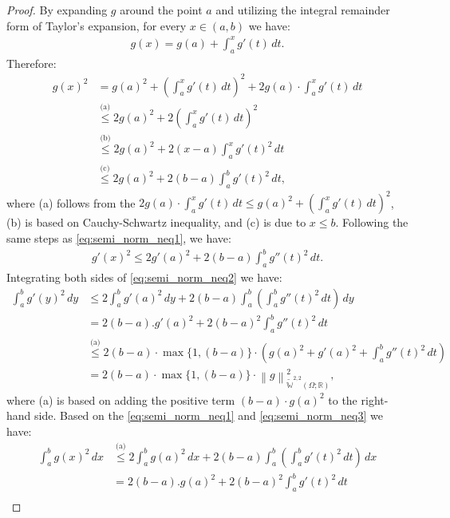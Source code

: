 \documentclass{article}
\newcommand{\norm}[1]{\left\lVert#1\right\rVert}
\newcommand{\sobeq}[2]{\widetilde{\mathbb{W}}^{#1,#2}\left(\Omega; \mathbb{R}\right)}
\newcommand{\lec}[2]{\stackrel{\text{#1}}{#2}}
\begin{document}
\begin{proof}
    By expanding $g$ around the point $a$ and utilizing the integral remainder form of Taylor's expansion, for every $x \in (a,b)$ we have:
    \begin{align}
        g(x) = g(a) + \int_a^x g'(t)\,dt.
    \end{align}
    Therefore: \begin{align}\label{eq:semi_norm_neq1}
        g(x)^2 &= g(a)^2 + \left(\int_a^x g'(t)\,dt \right)^2 + 2g(a)\cdot\int_a^x g'(t)\,dt \nonumber \\ 
        &\lec{(a)}{\leqslant} 2g(a)^2 + 2\left(\int_a^x g'(t)\,dt \right)^2 \nonumber \\ 
        &\lec{(b)}{\leqslant} 2g(a)^2 + 2(x-a)\int_a^x g'(t)^2\,dt \nonumber \\  
        &\lec{(c)}{\leqslant}  2g(a)^2 + 2(b-a)\int_a^b g'(t)^2\,dt,
    \end{align}
    where (a) follows from the $ 2g(a)\cdot\int_a^x g'(t)\,dt \leqslant g(a)^2 + \left(\int_a^x g'(t)\,dt \right)^2$, (b) is based on Cauchy-Schwartz inequality, and (c) is due to $x \leqslant b$. Following the same steps as \eqref{eq:semi_norm_neq1}, we have:
\begin{align}\label{eq:semi_norm_neq2}
        g'(x)^2 \leqslant 2g'(a)^2 + 2(b-a)\int_a^b g''(t)^2\,dt.
    \end{align}
    Integrating both sides of \eqref{eq:semi_norm_neq2} we have:
\begin{align}\label{eq:semi_norm_neq3}
        \int_a^b g'(y)^2\,dy &\leqslant 2\int_a^b g'(a)^2\,dy + 2(b-a)\int_a^b \left(\int_a^b g''(t)^2\,dt\right) \,dy \nonumber \\ 
        &= 2(b-a).g'(a)^2 + 2(b-a)^2 \int_a^b g''(t)^2\,dt \nonumber \\
        &\lec{(a)}{\leqslant} 2(b-a)\cdot \max\{1, (b-a)\} \cdot \left(g(a)^2 + g'(a)^2 + \int_a^b g''(t)^2\,dt \right)\nonumber \\
        &= 2(b-a)\cdot\max\{1, (b-a)\}\cdot\norm{g}^2_{\sobeq{2}{2}},
    \end{align}
    where (a) is based on adding the positive term $(b-a)\cdot g(a)^2$ to the right-hand side. Based on the \eqref{eq:semi_norm_neq1} and \eqref{eq:semi_norm_neq3} we have:
\begin{align}\label{eq:semi_norm_neq4}
        \int_a^b g(x)^2\,dx &\lec{(a)}{\leqslant} 2\int_a^b g(a)^2\,dx + 2(b-a)\int_a^b \left(\int_a^b g'(t)^2\,dt\right)\,dx \nonumber \\ 
        &= 2(b-a).g(a)^2 + 2(b-a)^2 \int_a^b g'(t)^2\,dt \nonumber \\ 

\end{align}
\end{proof}
\end{document}
